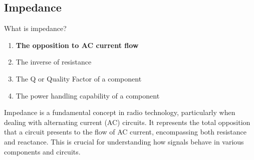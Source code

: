 \subsection{Impedance}
\label{T5C12}

\begin{tcolorbox}[colback=gray!10!white,colframe=black!75!black,title=T5C12]
What is impedance?
\begin{enumerate}[noitemsep]
    \item \textbf{The opposition to AC current flow}
    \item The inverse of resistance
    \item The Q or Quality Factor of a component
    \item The power handling capability of a component
\end{enumerate}
\end{tcolorbox}

Impedance is a fundamental concept in radio technology, particularly when dealing with alternating current (AC) circuits. It represents the total opposition that a circuit presents to the flow of AC current, encompassing both resistance and reactance. This is crucial for understanding how signals behave in various components and circuits.